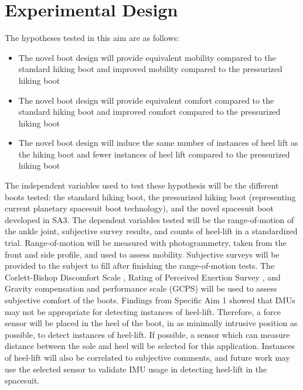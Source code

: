 \documentclass[defaultstyle,11pt]{comps}
\providecommand{\tightlist}{%
  \setlength{\itemsep}{0pt}\setlength{\parskip}{0pt}}
\begin{document}
\hypertarget{experimental-design}{%
\section{Experimental Design}\label{experimental-design}}

The hypotheses tested in this aim are as follows:

\begin{itemize}
\tightlist
\item
  The novel boot design will provide equivalent mobility compared to the standard hiking boot and improved mobility compared to the pressurized hiking boot
\item
  The novel boot design will provide equivalent comfort compared to the standard hiking boot and improved comfort compared to the pressurized hiking boot
\item
  The novel boot design will induce the same number of instances of heel lift as the hiking boot and fewer instances of heel lift compared to the pressurized hiking boot
\end{itemize}

The independent variables used to test these hypothesis will be the different boots tested: the standard hiking boot, the pressurized hiking boot (representing current planetary spacesuit boot technology), and the novel spacesuit boot developed in SA3.
The dependent variables tested will be the range-of-motion of the ankle joint, subjective survey results, and counts of heel-lift in a standardized trial.
Range-of-motion will be measured with photogrammetry, taken from the front and side profile, and used to assess mobility.
Subjective surveys will be provided to the subject to fill after finishing the range-of-motion tests.
The Corlett-Bishop Discomfort Scale \citep{Corlett1976}, Rating of Perceived Exertion Survey \citep{Borg1982}, and Gravity compensation and performance scale (GCPS) \citep{Gernhardt2009, Norcross2009, Norcross2010} will be used to assess subjective comfort of the boots.
Findings from Specific Aim 1 showed that IMUs may not be appropriate for detecting instances of heel-lift.
Therefore, a force sensor will be placed in the heel of the boot, in as minimally intrusive position as possible, to detect instances of heel-lift.
If possible, a sensor which can measure distance between the sole and heel will be selected for this application.
Instances of heel-lift will also be correlated to subjective comments, and future work may use the selected sensor to validate IMU usage in detecting heel-lift in the spacesuit.
\end{document}
